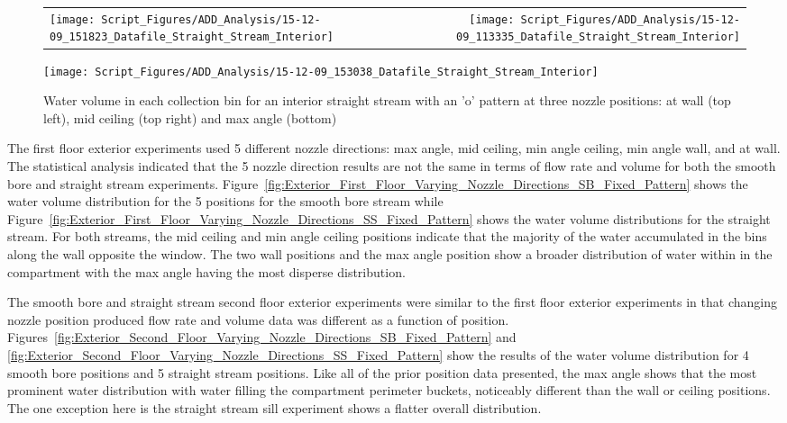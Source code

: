 \documentclass{article}
\begin{document}
\begin{figure}[ht]
\begin{tabular*}{\textwidth}{lr}
\texttt{[image: Script\_Figures/ADD\_Analysis/15-12-09\_151823\_Datafile\_Straight\_Stream\_Interior]} &
\texttt{[image: Script\_Figures/ADD\_Analysis/15-12-09\_113335\_Datafile\_Straight\_Stream\_Interior]} \\
\end{tabular*}
\centering
\texttt{[image: Script\_Figures/ADD\_Analysis/15-12-09\_153038\_Datafile\_Straight\_Stream\_Interior]}
\caption{Water volume in each collection bin for an interior straight stream with an 'o' pattern at three nozzle positions: at wall (top left), mid ceiling (top right) and max angle (bottom)}
\label{fig:Interior_Varying_Nozzle_Direction_SS_O_Pattern}
\end{figure}

\clearpage

The first floor exterior experiments used 5 different nozzle directions: max angle, mid ceiling, min angle ceiling, min angle wall, and at wall. The statistical analysis indicated that the 5 nozzle direction results are not the same in terms of flow rate and volume for both the smooth bore and straight stream experiments. Figure~\ref{fig:Exterior_First_Floor_Varying_Nozzle_Directions_SB_Fixed_Pattern} shows the water volume distribution for the 5 positions for the smooth bore stream while Figure~\ref{fig:Exterior_First_Floor_Varying_Nozzle_Directions_SS_Fixed_Pattern} shows the water volume distributions for the straight stream. For both streams, the mid ceiling and min angle ceiling positions indicate that the majority of the water accumulated in the bins along the wall opposite the window. The two wall positions and the max angle position show a broader distribution of water within in the compartment with the max angle having the most disperse distribution.

The smooth bore and straight stream second floor exterior experiments were similar to the first floor exterior experiments in that changing nozzle position produced flow rate and volume data was different as a function of position. Figures~\ref{fig:Exterior_Second_Floor_Varying_Nozzle_Directions_SB_Fixed_Pattern} and \ref{fig:Exterior_Second_Floor_Varying_Nozzle_Directions_SS_Fixed_Pattern} show the results of the water volume distribution for 4 smooth bore positions and 5 straight stream positions. Like all of the prior position data presented, the max angle shows that the most prominent water distribution with water filling the compartment perimeter buckets, noticeably different than the wall or ceiling positions. The one exception here is the straight stream sill experiment shows a flatter overall distribution. 
\end{document}
